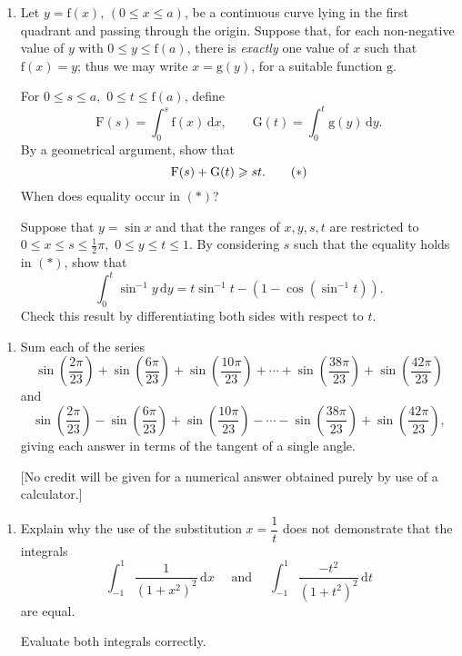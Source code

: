 \documentclass[a4, 11pt]{report}
\newlength{\qspace}
\newcounter{qnumber}
\newenvironment{question}%
 {\vspace{\qspace}
  \begin{enumerate}[\bfseries 1\quad][10]%
    \setcounter{enumi}{\value{qnumber}}%
    \item%
 }
{
  \end{enumerate}
  \filbreak
  \stepcounter{qnumber}
 }
\begin{document}
	\begin{question}
Let $y=\mathrm{f}(x)$, $(0\leqslant x\leqslant a)$, be a continuous
curve lying in the first quadrant and passing through the origin.
Suppose that, for each non-negative value of $y$ with $0\leqslant y\leqslant\mathrm{f}(a)$,
there is \textit{exactly} one value of $x$ such that $\mathrm{f}(x)=y$;
thus we may write $x=\mathrm{g}(y)$, for a suitable \phantom{} function $\mathrm{g}.$ 


For $0\leqslant s\leqslant a,$ $0\leqslant t\leqslant\mathrm{f}(a)$,
define 
\[
\mathrm{F}(s)=\int_{0}^{s}\mathrm{f}(x)\,\mathrm{d}x,\qquad\mathrm{G}(t)=\int_{0}^{t}\mathrm{g}(y)\,\mathrm{d}y.
\]
By a geometrical argument, show that 
\[
\mathrm{F}(s)+\mathrm{G}(t)\geqslant st.\tag{\ensuremath{*}}
\]
When does equality occur in $(*)$?


Suppose that $y=\sin x$ and that the ranges of $x,y,s,t$ are restricted
to $0\leqslant x\leqslant s\leqslant\frac{1}{2}\pi,$ $0\leqslant y\leqslant t\leqslant1$.
By considering $s$ such that the equality holds in $(*)$, show that
\[
\int_{0}^{t}\sin^{-1}y\,\mathrm{d}y=t\sin^{-1}t-\left(1-\cos(\sin^{-1}t)\right).
\]
Check this result by differentiating both sides with respect to $t$. 

	 \end{question}
	 
\begin{question}
Sum each of the series
\[
\sin\left(\frac{2\pi}{23}\right)+\sin\left(\frac{6\pi}{23}\right)+\sin\left(\frac{10\pi}{23}\right)+\cdots+\sin\left(\frac{38\pi}{23}\right)+\sin\left(\frac{42\pi}{23}\right)
\]
and 
\[
\sin\left(\frac{2\pi}{23}\right)-\sin\left(\frac{6\pi}{23}\right)+\sin\left(\frac{10\pi}{23}\right)-\cdots-\sin\left(\frac{38\pi}{23}\right)+\sin\left(\frac{42\pi}{23}\right),
\]
giving each answer in terms of the tangent of a single angle. 


{[}No credit will be given for a numerical answer obtained purely
by use of a calculator.{]}  
	\end{question}
	
	\begin{question}

Explain why the use of the substitution $x=\dfrac{1}{t}$ does not
demonstrate that the integrals 
\[
\int_{-1}^{1}\frac{1}{(1+x^{2})^{2}}\,\mathrm{d}x\quad\mbox{ and }\quad\int_{-1}^{1}\frac{-t^{2}}{(1+t^{2})^{2}}\,\mathrm{d}t
\]
are equal. 


Evaluate both integrals correctly.
		
		\end{question}
		
\end{document}
